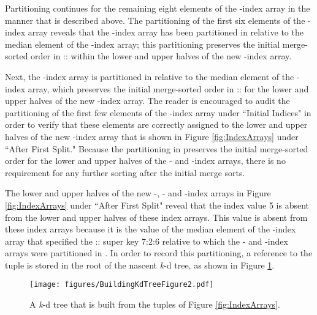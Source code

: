 \documentclass{sig-alternate}
\begin{document}
Partitioning continues for the remaining eight elements of the -index array in the manner that is described above.  The partitioning of the first six elements of the -index array reveals that the -index array has been partitioned in  relative to the median element of the -index array; this partitioning preserves the initial merge-sorted order in :: within the lower and upper halves of the new -index array.

Next, the -index array is partitioned in  relative to the median element of the -index array, which preserves the initial merge-sorted order in :: for the lower and upper halves of the new -index array.  The reader is encouraged to audit the partitioning of the first few elements of the -index array under ``Initial Indices" in order to verify that these elements are correctly assigned to the lower and upper halves of the new -index array that is shown in Figure \ref{fig:IndexArrays} under ``After First Split."  Because the partitioning in  preserves the initial merge-sorted order for the lower and upper halves of the - and -index arrays, there is no requirement for any further sorting after the  initial merge sorts.

The lower and upper halves of the new -, - and -index arrays in Figure \ref{fig:IndexArrays} under ``After First Split" reveal that the index value 5 is absent from the lower and upper halves of these index arrays.  This value is absent from these index arrays because it is the value of the median element of the -index array that specified the :: super key 7:2:6 relative to which the - and -index arrays were partitioned in .  In order to record this partitioning, a reference to the tuple  is stored in the root of the nascent \emph{k}-d tree, as shown in Figure \ref{fig:FinalTree}.

\begin{figure}[h]
\centering
\centerline{\texttt{[image: figures/BuildingKdTreeFigure2.pdf]}}
\caption{A \emph{k}-d tree that is built from the  tuples of Figure  \ref{fig:IndexArrays}.}
\label{fig:FinalTree}
\end{figure}
\end{document}
